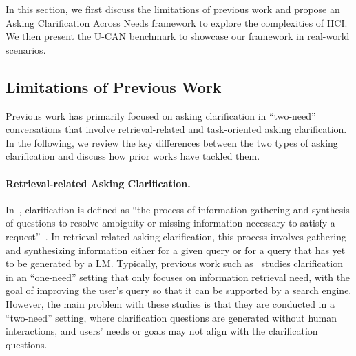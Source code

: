 \documentclass{article} %
\theoremstyle{definition}
\begin{document}
\label{sec:setting}
\setlength{\belowcaptionskip}{-0.2cm}

In this section, we first discuss the limitations of previous work and propose an Asking Clarification Across Needs framework to explore the complexities of HCI. We then present the U-CAN benchmark to showcase our framework in real-world scenarios.

\subsection{Limitations of Previous Work}
\label{subsec:clarification_literature}

Previous work has primarily focused on asking clarification in ``two-need'' conversations that involve retrieval-related and task-oriented asking clarification. In the following, we review the key differences between the two types of asking clarification and discuss how prior works have tackled them.
\paragraph{Retrieval-related Asking Clarification.}
In~\citep{clarify_survey,proactive_survey}, clarification is defined as ``the process of information gathering and synthesis of questions to resolve ambiguity or missing information necessary to satisfy a request''~\citep{clarify_survey}.
In retrieval-related asking clarification, this process involves gathering and synthesizing information either for a given query or for a query that has yet to be generated by a LM.
Typically, previous work such as~\citep{clarinet} studies clarification in an ``one-need'' setting that only focuses on information retrieval need, with the goal of improving the user's query so that it can be supported by a search engine.
However, the main problem with these studies is that they are conducted in a ``two-need'' setting, where clarification questions are generated without human interactions, and users' needs or goals may not align with the clarification questions.
\end{document}

